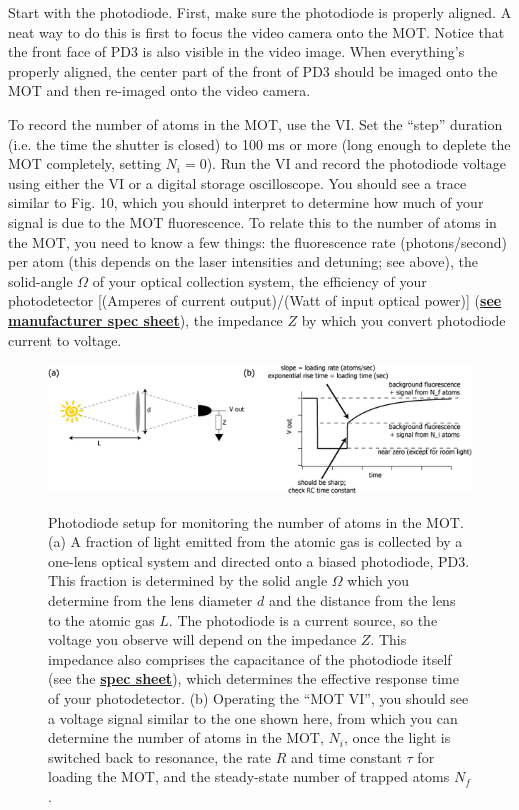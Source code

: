 \documentclass{../lab}
\begin{document}
Start with the photodiode. First, make sure the photodiode is properly aligned. A neat way to do this is first to focus the video camera onto the MOT. Notice that the front face of PD3 is also visible in the video image. When everything's properly aligned, the center part of the front of PD3 should be imaged onto the MOT and then re-imaged onto the video camera.

To record the number of atoms in the MOT, use the VI. Set the ``step'' duration (i.e. the time the shutter is closed) to 100 ms or more (long enough to deplete the MOT completely, setting $N_i = 0$). Run the VI and record the photodiode voltage using either the VI or a digital storage oscilloscope. You should see a trace similar to Fig. 10, which you should interpret to determine how much of your signal is due to the MOT fluorescence. To relate this to the number of atoms in the MOT, you need to know a few things: the fluorescence rate (photons/second) per atom (this depends on the laser intensities and detuning; see above), the solid-angle $\Omega$ of your optical collection system, the efficiency of your photodetector [(Amperes of current output)/(Watt of input optical power)] (\href{http://experimentationlab.berkeley.edu/sites/default/files/images/Photodiode\_info.pdf}{\textbf{see manufacturer spec sheet}}), the impedance $Z$ by which you convert photodiode current to voltage.

\begin{figure}[h]
    \centering
    \href{http://experimentationlab.berkeley.edu/sites/default/files/images/600px-PD3_v2.png}{\includegraphics[width=0.9\linewidth]{images/600px-PD3_v2.png}}
    \caption{Photodiode setup for monitoring the number of atoms in the MOT. (a) A fraction of light emitted from the atomic gas is collected by a one-lens optical system and directed onto a biased photodiode, PD3. This fraction is determined by the solid angle $\Omega$ which you determine from the lens diameter $d$ and the distance from the lens to the atomic gas $L$. The photodiode is a current source, so the voltage you observe will depend on the impedance $Z$. This impedance also comprises the capacitance of the photodiode itself (see the \href{http://experimentationlab.berkeley.edu/sites/default/files/images/Photodiode\_info.pdf}{\textbf{spec sheet}}), which determines the effective response time of your photodetector. (b) Operating the ``MOT VI'', you should see a voltage signal similar to the one shown here, from which you can determine the number of atoms in the MOT, $N_i$, once the light is switched back to resonance, the rate $R$ and time constant $\tau$ for loading the MOT, and the steady-state number of trapped atoms $N_f$.}
    \label{fig:600px-PD3_v2}
\end{figure}
\end{document}
